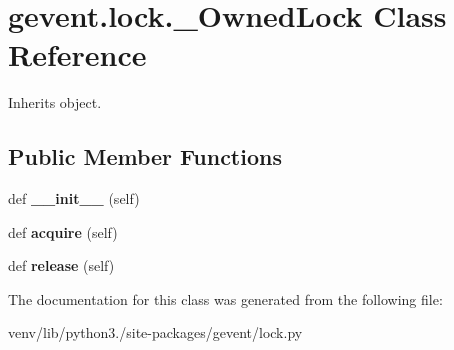 \hypertarget{classgevent_1_1lock_1_1___owned_lock}{}\section{gevent.\+lock.\+\_\+\+Owned\+Lock Class Reference}
\label{classgevent_1_1lock_1_1___owned_lock}


Inherits object.

\subsection*{Public Member Functions}
\begin{DoxyCompactItemize}
\item 
\mbox{\label{classgevent_1_1lock_1_1___owned_lock_a019fc4313922a82a555f3ad67f145d1c}} 
def {\bfseries \+\_\+\+\_\+init\+\_\+\+\_\+} (self)
\item 
\mbox{\label{classgevent_1_1lock_1_1___owned_lock_af5aed4f13d12cf9f7361d8bc2df0e1f4}} 
def {\bfseries acquire} (self)
\item 
\mbox{\label{classgevent_1_1lock_1_1___owned_lock_aba821e7fe04874f175f6d4695d2fc35e}} 
def {\bfseries release} (self)
\end{DoxyCompactItemize}


The documentation for this class was generated from the following file\+:\begin{DoxyCompactItemize}
\item 
venv/lib/python3./site-\/packages/gevent/lock.\+py\end{DoxyCompactItemize}
